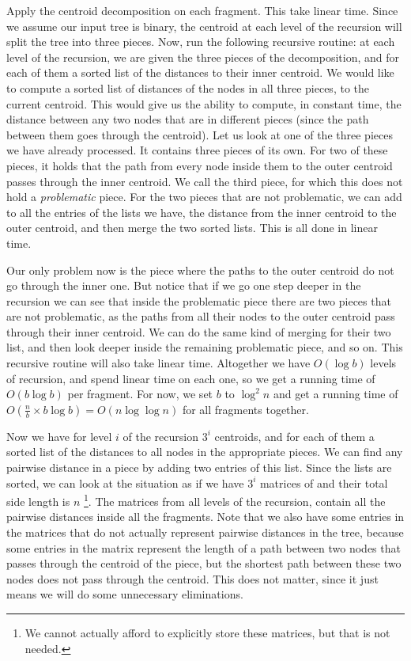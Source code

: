 \documentclass[11pt,a4paper]{article}
\theoremstyle{definition}
\theoremstyle{remark}
\begin{document}
Apply the centroid decomposition on each fragment. This take linear time. Since we assume our input tree is binary, the centroid at each level of the recursion will split the tree into three pieces. Now, run the following recursive routine: at each level of the recursion, we are given the three pieces of the decomposition, and for each of them a sorted list of the distances to their inner centroid. We would like to compute a sorted list of distances of the nodes in all three pieces, to the current centroid. This would give us the ability to compute, in constant time, the distance between any two nodes that are in different pieces (since the path between them goes through the centroid). Let us look at one of the three pieces we have already processed. It contains three pieces of its own. For two of these pieces, it holds that the path from every node inside them to the outer centroid passes through the inner centroid. We call the third piece, for which this does not hold a \textit{problematic} piece. For the two pieces that are not problematic, we can add to all the entries of the lists we have, the distance from the inner centroid to the outer centroid, and then merge the two sorted lists. This is all done in linear time.

Our only problem now is the piece where the paths to the outer centroid do not go through the inner one. But notice that if we go one step deeper in the recursion we can see that inside the problematic piece there are two pieces that are not problematic, as the paths from all their nodes to the outer centroid pass through their inner centroid. We can do the same kind of merging for their two list, and then look deeper inside the remaining problematic piece, and so on. This recursive routine will also take linear time. Altogether we have $O(\log b)$ levels of recursion, and spend linear time on each one, so we get a running time of $O(b \log b)$ per fragment. For now, we set $b$ to $\log ^2 n$ and get a running time of $O(\frac{n}{b} \times b\log b) = O(n \log \log n)$ for all fragments together.

Now we have for level $i$ of the recursion $3^i$ centroids, and for each of them a sorted list of the distances to all nodes in the appropriate pieces. We can find any pairwise distance in a piece by adding two entries of this list. Since the lists are sorted, we can look at the situation as if we have $3^i$ matrices of and their total side length is $n$ \footnote{We cannot actually afford to explicitly store these matrices, but that is not needed.}. The matrices from all levels of the recursion, contain all the pairwise distances inside all the fragments. Note that we also have some entries in the matrices that do not actually represent pairwise distances in the tree, because some entries in the matrix represent the length of a path between two nodes that passes through the centroid of the piece, but the shortest path between these two nodes does not pass through the centroid. This does not matter, since it just means we will do some unnecessary eliminations.
\end{document}
